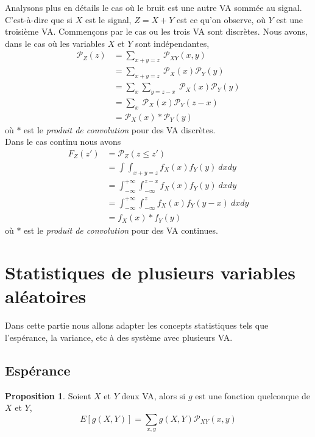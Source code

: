 \documentclass[a4paper,12pt]{report}
\theoremstyle{definition}
\renewcommand{\(}{\left(}
\renewcommand{\)}{\right)}
\renewcommand{\P}{\mathcal{P}}
\renewcommand{\d}{\textit}
\newtheorem{prop}[thm]{Proposition}
\begin{document}
            Analysons plus en détails le cas où le bruit est une autre VA sommée au signal. C'est-à-dire que si $X$ est le signal, $Z=X+Y$ est ce qu'on observe, où $Y$ est une troisième VA. Commençons par le cas ou les trois VA sont discrètes. Nous avons, dans le cas où les variables $X$ et $Y$ sont indépendantes,
            \begin{align*}
                \P_Z(z) &= \sum_{x+y=z}~\P_{XY}(x,y) \\
                &= \sum_{x+y=z}~\P_{X}(x)\P_Y(y) \\
                &= \sum_{x}\sum_{y=z-x}~\P_{X}(x)\P_Y(y) \\
                &= \sum_{x}~\P_{X}(x)\P_Y(z-x) \\
                &= \P_{X}(x)*\P_Y(y)
            \end{align*}
            où $*$ est le \d{produit de convolution} pour des VA discrètes.\\
            Dans le cas continu nous avons
            \begin{align*}
                F_Z(z') &= \P_Z(z\leq z') \\ 
                &= \int\int_{x+y=z}f_X(x)f_Y(y)~dxdy \\
                &= \int_{-\infty}^{+\infty}\int_{-\infty}^{z-x} f_X(x)f_Y(y)~dxdy \\
                &= \int_{-\infty}^{+\infty}\int_{-\infty}^{z} f_X(x)f_Y(y-x)~dxdy \\
                &= f_X(x)*f_Y(y)
            \end{align*}
            où $*$ est le \d{produit de convolution} pour des VA continues.
            
    \section{Statistiques de plusieurs variables aléatoires}
    
        Dans cette partie nous allons adapter les concepts statistiques tels que l'espérance, la variance, etc à des système avec plusieurs VA.
        
        \subsection{Espérance}
        
        \begin{leftbar}
        \begin{prop}
            Soient $X$ et $Y$ deux VA, alors si $g$ est une fonction quelconque de $X$ et $Y$,
            $$E[g(X,Y)] = \sum_{x,y} g(X,Y)\P_{XY}(x,y)$$
        \end{prop}
        \end{leftbar}
        
\end{document}
